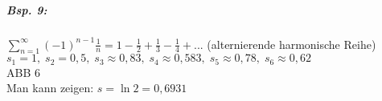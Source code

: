 \begin{enumerate} [label= \arabic*.]
\begin{enumerate}[label=(\Alph*)]
\subparagraph{Bsp. 9:} $\sum_{n=1}^\infty (-1)^{n-1} \frac{1}{n}=1-\frac{1}{2}+\frac{1}{3}-\frac{1}{4}+...$ (alternierende harmonische Reihe)\\
$s_1=1, \; s_2=0,5, \; s_3\approx 0,83, \; s_4\approx 0,583, \; s_5\approx 0,78, \; s_6\approx 0,62$\\
ABB 6\\
Man kann zeigen: $s=\ln 2 = 0,6931$

\end{enumerate}

\end{enumerate}


 